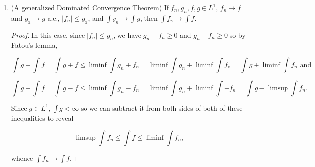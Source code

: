 \documentclass[11pt,oneside,english]{amsart}
\theoremstyle{definition}
\newcommand{\R}{\mathbb{R}}
\newcommand{\ve}{\varepsilon}
\begin{document}
\begin{enumerate}
\begin{enumerate}
\begin{proof}
\[
\left|\int f_n-\int f\right|=\left|\int f_n-f\right|\leq \int|f_n-f|\rightarrow0,
\]

so $\int f_n\rightarrow \int f$.
\end{proof}

\item If $\mu(X)=\infty$, the conclusions of (a) can fail. (Find examples on $\R$ with Lebesgue measure.)

Let $X=\R$. We'll first find a counterexample to the first conclusion that $f\in L^1(m)$ where $m$ is the Lebesgue measure. Consider the sequence of functions $f_n=\chi_{[0,n)}$. For each $n$, $f_n\in L^1(m)$ (in fact $\int_\R f_n=n$), and $f_n\rightarrow 1\equiv f$ uniformly, but $\int_\R f=\int_\R 1=1\cdot m(\R)=\infty$, so $f\notin L^1(m)$.

Next we find a counterexample to the second conclusion that $\int f_n\rightarrow \int f$. Consider the sequence of functions $f_n=\frac{1}{n}\chi_{[0,n]}$. Then $f_n\rightarrow 0$ uniformly since, given any $\ve>0$, simply choose $N>\frac{1}{\ve}$ and $\left|\frac{1}{n}\chi_{[0,n]}\right|<\ve$ for all $x\in \R$ whenever $n\geq N$. Note that $\int_\R f_n=1$ for all $n$ by construction, so $\lim\int_\R f_n=1$, but $\int_\R f=\int_\R 0=0\neq 1$, so $\int f_n\not\rightarrow\int f$ in this case.
\end{enumerate}

\item (A generalized Dominated Convergence Theorem) If $f_n,g_n,f,g\in L^1$, $f_n\rightarrow f$ and $g_n\rightarrow g$ a.e., $|f_n|\leq g_n$, and $\int g_n\rightarrow \int g$, then $\int f_n\rightarrow \int f$.

\begin{proof}
In this case, since $|f_n|\leq g_n$, we have $g_n+f_n\geq0$ and $g_n-f_n\geq0$ so by Fatou's lemma,

\[
\int g +\int f=\int g+f\leq \liminf \int g_n + f_n= \liminf\int g_n +\liminf\int f_n=\int g+\liminf \int f_n\text{ and}
\]

\[
\int g -\int f=\int g-f\leq \liminf \int g_n -f_n= \liminf\int g_n +\liminf\int -f_n=\int g-\limsup \int f_n.
\]

Since $g\in L^1$, $\int g<\infty$ so we can subtract it from both sides of both of these inequalities to reveal 

\[
\limsup \int f_n \leq \int f\leq \liminf \int f_n,
\]

whence $\int f_n\rightarrow \int f$.
\end{proof}


\end{enumerate}
\end{document}
